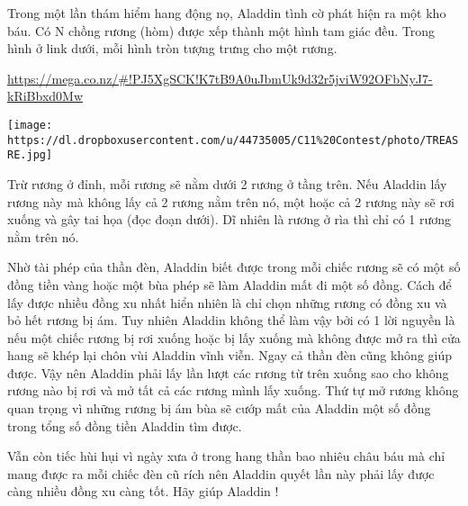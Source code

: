 Trong một lần thám hiểm hang động nọ, Aladdin tình cờ phát hiện ra một kho báu. Có N chồng rương (hòm) được xếp thành một hình tam giác đều. Trong hình ở link dưới, mỗi hình tròn tượng trưng cho một rương.

\href{https://mega.co.nz/#!PJ5XgSCK!K7tB9A0uJbmUk9d32r5jviW92OFbNyJ7-kRiBbxd0Mw}{https://mega.co.nz/\#!PJ5XgSCK!K7tB9A0uJbmUk9d32r5jviW92OFbNyJ7-kRiBbxd0Mw }


\texttt{[image: https://dl.dropboxusercontent.com/u/44735005/C11\%20Contest/photo/TREASRE.jpg]}

Trừ rương ở đỉnh, mỗi rương sẽ nằm dưới 2 rương ở tầng trên. Nếu Aladdin lấy rương này mà không lấy cả 2 rương nằm trên nó, một hoặc cả 2 rương này sẽ rơi xuống và gây tai họa (đọc đoạn dưới). Dĩ nhiên là rương ở rìa thì chỉ có 1 rương nằm trên nó.

Nhờ tài phép của thần đèn, Aladdin biết được trong mỗi chiếc rương sẽ có một số đồng tiền vàng hoặc một bùa phép sẽ làm Aladdin mất đi một số đồng. Cách để lấy được nhiều đồng xu nhất hiển nhiên là chỉ chọn những rương có đồng xu và bỏ hết rương bị ám. Tuy nhiên Aladdin không thể làm vậy bởi có 1 lời nguyền là nếu một chiếc rương bị rơi xuống hoặc bị lấy xuống mà không được mở ra thì cửa hang sẽ khép lại chôn vùi Aladdin vĩnh viễn. Ngay cả thần đèn cũng không giúp được. Vậy nên Aladdin phải lấy lần lượt các rương từ trên xuống sao cho không rương nào bị rơi và mở tất cả các rương mình lấy xuống. Thứ tự mở rương không quan trọng vì những rương bị ám bùa sẽ cướp mất của Aladdin một số đồng trong tổng số đồng tiền Aladdin tìm được.

Vẫn còn tiếc hùi hụi vì ngày xưa ở trong hang thần bao nhiêu châu báu mà chỉ mang được ra mỗi chiếc đèn cũ rích nên Aladdin quyết lần này phải lấy được càng nhiều đồng xu càng tốt. Hãy giúp Aladdin !

\